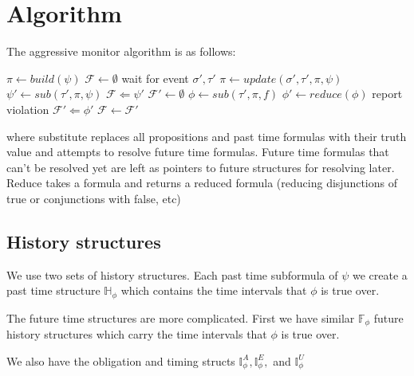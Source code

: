 \documentclass[10pt,a4paper]{article}
\begin{document}
\section{Algorithm}

The aggressive monitor algorithm is as follows:

\begin{algorithmic}
\STATE $\pi \leftarrow build(\psi)$
\STATE $\mathcal{F} \leftarrow \emptyset$
\LOOP
\STATE wait for event $\sigma',\tau'$
\STATE $\pi \leftarrow update(\sigma', \tau', \pi, \psi)$
\STATE $\psi' \leftarrow sub(\tau', \pi, \psi)$
\STATE $\mathcal{F} \Leftarrow \psi'$
\STATE $\mathcal{F}' \leftarrow \emptyset$
\STATE $\phi \leftarrow sub(\tau', \pi, f)$
\STATE $\phi' \leftarrow reduce(\phi)$
\STATE report violation
\STATE $\mathcal{F}' \Leftarrow \phi'$
\ENDIF
\ENDFOR
\STATE $\mathcal{F} \leftarrow \mathcal{F}'$
\ENDLOOP
\end{algorithmic}

where substitute replaces all propositions and past time formulas with their truth value and attempts to resolve future time formulas. Future time formulas that can't be resolved yet are left as pointers to future structures for resolving later. Reduce takes a formula and returns a reduced formula (reducing disjunctions of true or conjunctions with false, etc)

\subsection{History structures}
We use two sets of history structures. Each past time subformula of $\psi$ we create a past time structure $\mathbb{H}_{\phi}$ which contains the time intervals that $\phi$ is true over.

The future time structures are more complicated. First we have similar $\mathbb{F}_{\phi}$ future history structures which carry the time intervals that $\phi$ is true over.

We also have the obligation and timing structs $\mathbb{I}_{\phi}^{A},\mathbb{I}_{\phi}^{E},$ and $\mathbb{I}_{\phi}^{U}$
\end{document}
